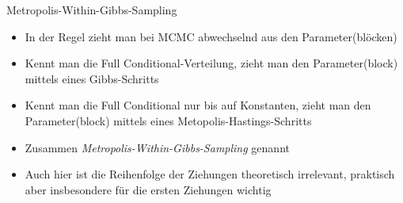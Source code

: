 \documentclass[ignorenonframetext,]{beamer}
\providecommand{\tightlist}{%
\setlength{\itemsep}{0pt}\setlength{\parskip}{0pt}}
\begin{document}
\begin{frame}{Metropolis-Within-Gibbs-Sampling}

\begin{itemize}
\tightlist
\item
  In der Regel zieht man bei MCMC abwechselnd aus den Parameter(blöcken)
\item
  Kennt man die Full Conditional-Verteilung, zieht man den
  Parameter(block) mittels eines Gibbs-Schritts
\item
  Kennt man die Full Conditional nur bis auf Konstanten, zieht man den
  Parameter(block) mittels eines Metopolis-Hastings-Schritts
\item
  Zusammen \emph{Metropolis-Within-Gibbs-Sampling} genannt
\item
  Auch hier ist die Reihenfolge der Ziehungen theoretisch irrelevant,
  praktisch aber insbesondere für die ersten Ziehungen wichtig
\end{itemize}

\end{frame}
\end{document}
